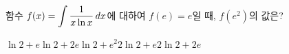 \hspace*{2mm}\begin{minipage}[t]{\dimexpr\linewidth-2mm\relax}\vspace{0pt}
함수 $f(x)=\displaystyle\int\dfrac{1}{x\ln x}\mkern3mu dx$에 대하여 $f(e)=e$일 때, $f(e^2)$의 값은?
\begin{choices32}{$\ln 2+e$}{$\ln 2+2e$}{$\ln 2+e^2$}{$2\ln 2+e$}{$2\ln 2+2e$}\end{choices32}\end{minipage}
